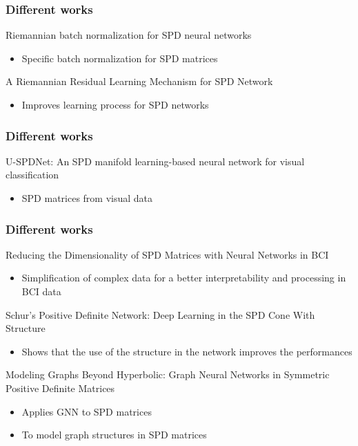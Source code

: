 \documentclass{beamer}
\begin{document}
\begin{frame}
    \frametitle{Different works}
    Riemannian batch normalization for SPD neural networks \cite{brooks2019riemannianbatchnormalizationspd}
    \begin{itemize}
        \item Specific batch normalization for SPD matrices
    \end{itemize}
    A Riemannian Residual Learning Mechanism for SPD Network \cite{10651149}
    \begin{itemize}
        \item Improves learning process for SPD networks
    \end{itemize}
    \frametitle{Different works}
    U-SPDNet: An SPD manifold learning-based neural network for visual classification \cite{WANG2023382}
    \begin{itemize}
        \item SPD matrices from visual data
    \end{itemize}
\end{frame}
\begin{frame}
    \frametitle{Different works}
    Reducing the Dimensionality of SPD Matrices with Neural Networks in BCI \cite{articledimension}
    \begin{itemize}
        \item Simplification of complex data for a better interpretability and processing in BCI data
    \end{itemize}
    Schur's Positive Definite Network: Deep Learning in the SPD Cone With Structure \cite{pouliquen:hal-04726325}
    \begin{itemize}
        \item Shows that the use of the structure in the network improves the performances
    \end{itemize}
    Modeling Graphs Beyond Hyperbolic: Graph Neural Networks in Symmetric Positive Definite Matrices \cite{zhao2023modelinggraphshyperbolicgraph}
    \begin{itemize}
        \item Applies GNN to SPD matrices
        \item To model graph structures in SPD matrices
    \end{itemize}
\end{frame}
\end{document}
